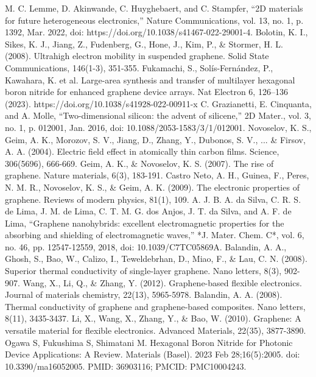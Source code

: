 \documentclass[conference]{IEEEtran}
\begin{document}
\begin{thebibliography}{00}
 M. C. Lemme, D. Akinwande, C. Huyghebaert, and C. Stampfer, ``2D materials for future heterogeneous electronics,'' Nature Communications, vol. 13, no. 1, p. 1392, Mar. 2022, doi: https://doi.org/10.1038/s41467-022-29001-4.
 Bolotin, K. I., Sikes, K. J., Jiang, Z., Fudenberg, G., Hone, J., Kim, P., \& Stormer, H. L. (2008). Ultrahigh electron mobility in suspended graphene. Solid State Communications, 146(1-3), 351-355.
 Fukamachi, S., Sol\'is-Fern\'andez, P., Kawahara, K. et al. Large-area synthesis and transfer of multilayer hexagonal boron nitride for enhanced graphene device arrays. Nat Electron 6, 126–136 (2023). https://doi.org/10.1038/s41928-022-00911-x
 C. Grazianetti, E. Cinquanta, and A. Molle, ``Two-dimensional silicon: the advent of silicene,'' 2D Mater., vol. 3, no. 1, p. 012001, Jan. 2016, doi: 10.1088/2053-1583/3/1/012001.
 Novoselov, K. S., Geim, A. K., Morozov, S. V., Jiang, D., Zhang, Y., Dubonos, S. V., ... \& Firsov, A. A. (2004). Electric field effect in atomically thin carbon films. Science, 306(5696), 666-669.
 Geim, A. K., \& Novoselov, K. S. (2007). The rise of graphene. Nature materials, 6(3), 183-191.
 Castro Neto, A. H., Guinea, F., Peres, N. M. R., Novoselov, K. S., \& Geim, A. K. (2009). The electronic properties of graphene. Reviews of modern physics, 81(1), 109.
 A. J. B. A. da Silva, C. R. S. de Lima, J. M. de Lima, C. T. M. G. dos Anjos, J. T. da Silva, and A. F. de Lima, ``Graphene nanohybrids: excellent electromagnetic properties for the absorbing and shielding of electromagnetic waves,'' *J. Mater. Chem. C*, vol. 6, no. 46, pp. 12547-12559, 2018, doi: 10.1039/C7TC05869A.
 Balandin, A. A., Ghosh, S., Bao, W., Calizo, I., Teweldebrhan, D., Miao, F., \& Lau, C. N. (2008). Superior thermal conductivity of single-layer graphene. Nano letters, 8(3), 902-907.
 Wang, X., Li, Q., \& Zhang, Y. (2012). Graphene-based flexible electronics. Journal of materials chemistry, 22(13), 5965-5978.
 Balandin, A. A. (2008). Thermal conductivity of graphene and graphene-based composites. Nano letters, 8(11), 3435-3437.
 Li, X., Wang, X., Zhang, Y., \& Bao, W. (2010). Graphene: A versatile material for flexible electronics. Advanced Materials, 22(35), 3877-3890.
 Ogawa S, Fukushima S, Shimatani M. Hexagonal Boron Nitride for Photonic Device Applications: A Review. Materials (Basel). 2023 Feb 28;16(5):2005. doi: 10.3390/ma16052005. PMID: 36903116; PMCID: PMC10004243. 

\end{thebibliography}
\end{document}
